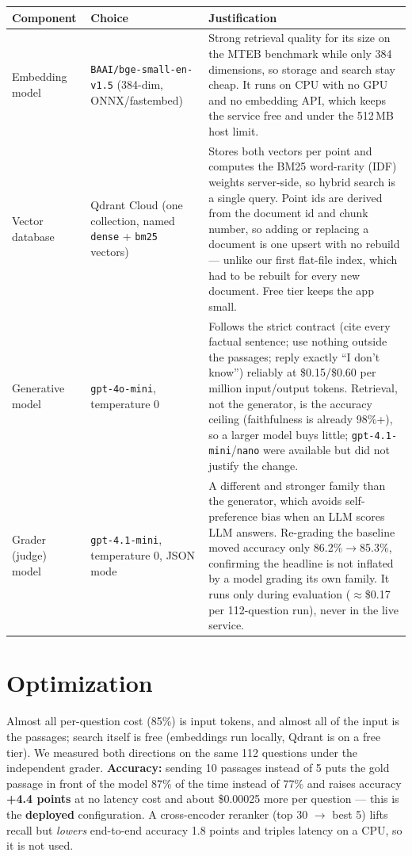 \documentclass[10pt]{article}
\begin{document}
\begin{center}
\footnotesize
\begin{tabular}{@{}p{2.1cm}p{3.5cm}p{10.6cm}@{}}
\toprule
\textbf{Component} & \textbf{Choice} & \textbf{Justification} \\
\midrule
Embedding model & \texttt{BAAI/\allowbreak bge-small-\allowbreak en-v1.5} (384-dim, ONNX/fastembed) &
Strong retrieval quality for its size on the MTEB benchmark while only 384 dimensions, so storage and search stay cheap.
It runs on CPU with no GPU and no embedding API, which keeps the service free and under the 512\,MB host limit. \\
\addlinespace
Vector database & Qdrant Cloud (one collection, named \texttt{dense} + \texttt{bm25} vectors) &
Stores both vectors per point and computes the BM25 word-rarity (IDF) weights server-side, so hybrid search is a single
query. Point ids are derived from the document id and chunk number, so adding or replacing a document is one upsert with no
rebuild --- unlike our first flat-file index, which had to be rebuilt for every new document. Free tier keeps the app small. \\
\addlinespace
Generative model & \texttt{gpt-4o-mini}, temperature 0 &
Follows the strict contract (cite every factual sentence; use nothing outside the passages; reply exactly ``I don't know'')
reliably at \$0.15/\$0.60 per million input/output tokens. Retrieval, not the generator, is the accuracy ceiling
(faithfulness is already 98\%+), so a larger model buys little; \texttt{gpt-4.1-mini}/\texttt{nano} were available but did not
justify the change. \\
\addlinespace
Grader (judge) model & \texttt{gpt-4.1-mini}, temperature 0, JSON mode &
A different and stronger family than the generator, which avoids self-preference bias when an LLM scores LLM answers.
Re-grading the baseline moved accuracy only 86.2\%$\rightarrow$85.3\%, confirming the headline is not inflated by a model
grading its own family. It runs only during evaluation ($\approx$\$0.17 per 112-question run), never in the live service. \\
\bottomrule
\end{tabular}
\end{center}

\section{Optimization}

Almost all per-question cost (85\%) is input tokens, and almost all of the input is the passages; search itself is free
(embeddings run locally, Qdrant is on a free tier). We measured both directions on the same 112 questions under the
independent grader. \textbf{Accuracy:} sending 10 passages instead of 5 puts the gold passage in front of the model 87\% of
the time instead of 77\% and raises accuracy \textbf{+4.4 points} at no latency cost and about \$0.00025 more per question ---
this is the \textbf{deployed} configuration. A cross-encoder reranker (top 30 $\rightarrow$ best 5) lifts recall but
\textit{lowers} end-to-end accuracy 1.8 points and triples latency on a CPU, so it is not used.
\end{document}

